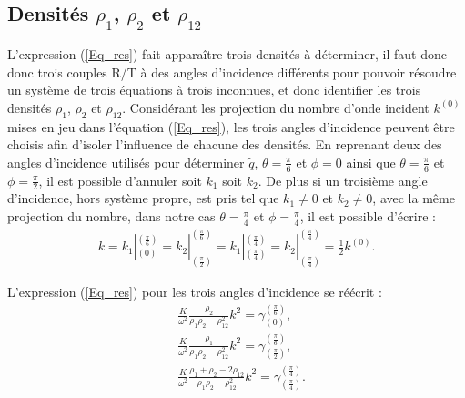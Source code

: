 \documentclass[twoside,openright]{report}
\begin{document}
\subsection{Densités $\rho_1$, $\rho_2$ et $\rho_{12}$}
\label{Ch_Inv_S_rho_SS_rho1/2/12}
    L'expression (\ref{Eq_res}) fait apparaître trois densités à déterminer, il faut donc donc trois couples R/T à des angles d'incidence différents pour pouvoir résoudre un système de trois équations à trois inconnues, et donc identifier les trois densités $\rho_1$, $\rho_2$ et $\rho_{12}$.
    Considérant les projection du nombre d'onde incident $k^{(0)}$ mises en jeu dans l'équation (\ref{Eq_res}), les trois angles d'incidence peuvent être choisis afin d'isoler l'influence de chacune des densités. En reprenant deux des angles d'incidence utilisés pour déterminer $\tilde{q}$, $\theta=\frac{\pi}{6}$ et $\phi=0$ ainsi que $\theta=\frac{\pi}{6}$ et $\phi=\frac{\pi}{2}$, il est possible d'annuler soit $k_1$ soit $k_2$. De plus si un troisième angle d'incidence, hors système propre, est pris tel que $k_1\ne 0$ et $k_2\ne 0$, avec la même projection du nombre, dans notre cas $\theta=\frac{\pi}{4}$ et $\phi=\frac{\pi}{4}$, il est possible d'écrire :
    \begin{align}
        k=k_1|^{(\frac{\pi}{6})}_{(0)}=k_2|^{(\frac{\pi}{6})}_{(\frac{\pi}{2})}=k_1|^{(\frac{\pi}{4})}_{(\frac{\pi}{4})}=k_2|^{(\frac{\pi}{4})}_{(\frac{\pi}{4})}=\frac{1}{2}k^{(0)}.
    \end{align}
    
    L'expression (\ref{Eq_res}) pour les trois angles d'incidence se réécrit :
        \begin{align}
    &\frac{K}{\omega^2}\frac{\rho_2}{\rho_1\rho_2-\rho_{12}^2}k^2=\gamma^{(\frac{\pi}{6})}_{(0)}\label{Comp_1},\\ &\frac{K}{\omega^2}\frac{\rho_1}{\rho_1\rho_2-\rho_{12}^2}k^2=\gamma^{(\frac{\pi}{6})}_{(\frac{\pi}{2})}\label{Comp_2},\\ &\frac{K}{\omega^2}\frac{\rho_1+\rho_2-2\rho_{12}}{\rho_1\rho_2-\rho_{12}^2}k^2=\gamma^{(\frac{\pi}{4})}_{(\frac{\pi}{4})}\label{Comp_3}.
    \end{align}
\end{document}
